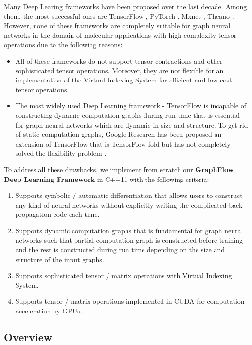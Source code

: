 \documentclass[a4paper]{article}
\begin{document}
Many Deep Learing frameworks have been proposed over the last decade. Among them, the most successful ones are TensorFlow \cite{Google-Research}, PyTorch \cite{PyTorch}, Mxnet \cite{Mxnet}, Theano \cite{Theano}. However, none of these frameworks are completely suitable for graph neural networks in the domain of molecular applications with high complexity tensor operations due to the following reasons:
\begin{itemize}
	\item All of these frameworks do not support tensor contractions and other sophisticated tensor operations. Moreover, they are not flexible for an implementation of the Virtual Indexing System for efficient and low-cost tensor operations.
	\item The most widely used Deep Learning framework - TensorFlow is incapable of constructing dynamic computation graphs during run time that is essential for graph neural networks which are dynamic in size and structure. To get rid of static computation graphs, Google Research has been proposed an extension of TensorFlow that is TensorFlow-fold but has not completely solved the flexibility problem \cite{TF-fold}.
\end{itemize}
To address all these drawbacks, we implement from scratch our \textbf{GraphFlow Deep Learning Framework} in C++11 with the following criteria:
\begin{enumerate}
	\item Supports symbolic / automatic differentiation that allows users to construct any kind of neural networks without explicitly writing the complicated back-propagation code each time.
	\item Supports dynamic computation graphs that is fundamental for graph neural networks such that partial computation graph is constructed before training and the rest is constructed during run time depending on the size and structure of the input graphs.
	\item Supports sophisticated tensor / matrix operations with Virtual Indexing System.
	\item Supports tensor / matrix operations implemented in CUDA for computation acceleration by GPUs.  
\end{enumerate}

\subsection{Overview}
\end{document}
